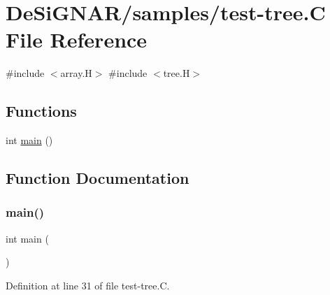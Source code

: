 \hypertarget{test-tree_8_c}{}\section{De\+Si\+G\+N\+A\+R/samples/test-\/tree.C File Reference}
\label{test-tree_8_c}
{\ttfamily \#include $<$array.\+H$>$}\newline
{\ttfamily \#include $<$tree.\+H$>$}\newline
\subsection*{Functions}
\begin{DoxyCompactItemize}
\item 
int \hyperlink{test-tree_8_c_ae66f6b31b5ad750f1fe042a706a4e3d4}{main} ()
\end{DoxyCompactItemize}


\subsection{Function Documentation}
\mbox{\label{test-tree_8_c_ae66f6b31b5ad750f1fe042a706a4e3d4}} 
\subsubsection{\texorpdfstring{main()}{main()}}
{\footnotesize\ttfamily int main (\begin{DoxyParamCaption}{ }\end{DoxyParamCaption})}



Definition at line 31 of file test-\/tree.\+C.

